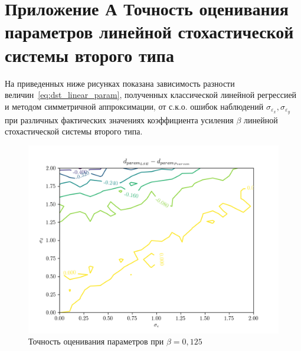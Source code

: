 \renewcommand{\thefigure}{\Asbuk{section}.\arabic{figure}}
\renewcommand{\thetable}{\Asbuk{section}.\arabic{table}}
\renewcommand{\thelstlisting}{\Asbuk{section}.\arabic{lstlisting}}

\chapter*{%
  Приложение А \hspace{10cm}
  Точность оценивания параметров
  линейной стохастической системы второго типа
}

\setcounter{section}{1}
\setcounter{figure}{0}
\setcounter{table}{0}
\setcounter{lstlisting}{0}

На приведенных ниже рисунках показана зависимость разности
величин~\eqref{eq:dst_linear_param},
полученных классической линейной регрессией и методом симметричной аппроксимации,
от с.к.о. ошибок наблюдений \( \sigma_{\varepsilon_x}, \sigma_{\varepsilon_y} \) при
различных фактических значениях коэффициента усиления \( \beta \)
линейной стохастической системы второго типа.

\begin{figure}[h]
  \centering
  \includegraphics[width=150mm]{fig/linear/param/beta-0,125_param.png}
  \caption{Точность оценивания параметров при \( \beta = 0{,}125 \)}
\end{figure}


